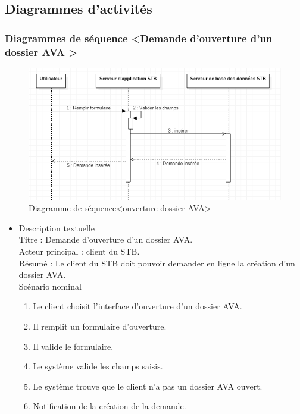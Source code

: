  \subsection{Diagrammes d'activités}
 
 \subsubsection{Diagrammes de séquence \textless Demande d'ouverture d'un dossier AVA \textgreater}

\begin{figure}[!h]
 \begin{center}
\includegraphics{./conception/sequence_ouverture}

\caption{Diagramme de séquence\textless ouverture dossier AVA\textgreater}
\end{center}
\end{figure}

\begin{itemize}
\item  Description textuelle \\
Titre : Demande d'ouverture d'un dossier AVA.\\
Acteur principal : client du STB.\\
Résumé : Le client du STB doit pouvoir demander en ligne la création d'un dossier AVA.\\

Scénario nominal\\
\begin{enumerate}
\item Le client choisit l'interface d'ouverture d'un dossier AVA.
\item Il remplit un formulaire d'ouverture.
\item Il valide le formulaire.
\item Le système valide les champs saisis.
\item Le système trouve que le client n'a pas un dossier AVA ouvert.
\item Notification de la création de la demande.
\end{enumerate}
\end{itemize}

